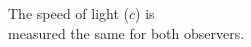 \documentclass[preview]{standalone}
\begin{document}
\begin{center}
The speed of light ($c$) is \\ measured the same for both observers.
\end{center}
\end{document}
